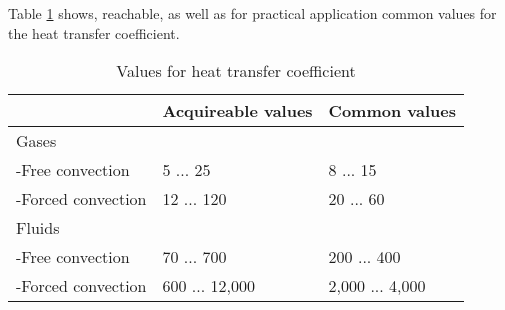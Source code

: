 Table \ref{fig:htc_values} shows, reachable, as well as for practical application common values for the heat transfer coefficient.
\begin{table}[ht]
\centering
\caption{Values for heat transfer coefficient}
\label{fig:htc_values}
\begin{tabular}{lll}
&Acquireable values&Common values\\
\hline
Gases&&\\
-Free convection&5 ... 25&8 ... 15\\
-Forced convection&12 ... 120&20 ... 60\\
Fluids&&\\
-Free convection&70 ... 700&200 ... 400\\
-Forced convection&600 ... 12,000&2,000 ... 4,000\\
\end{tabular}
\end{table}







